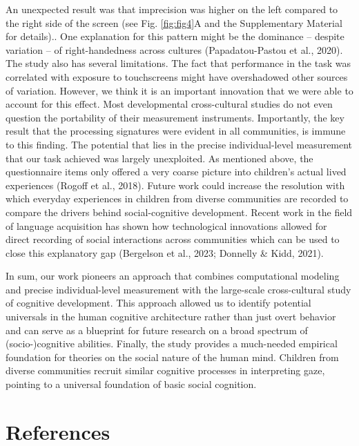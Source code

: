 \documentclass[
  man,floatsintext]{apa7}
\begin{document}
An unexpected result was that imprecision was higher on the left compared to the right side of the screen (see Fig. \ref{fig:fig4}A and the Supplementary Material for details).. One explanation for this pattern might be the dominance -- despite variation -- of right-handedness across cultures (Papadatou-Pastou et al., 2020). The study also has several limitations. The fact that performance in the task was correlated with exposure to touchscreens might have overshadowed other sources of variation. However, we think it is an important innovation that we were able to account for this effect. Most developmental cross-cultural studies do not even question the portability of their measurement instruments. Importantly, the key result that the processing signatures were evident in all communities, is immune to this finding. The potential that lies in the precise individual-level measurement that our task achieved was largely unexploited. As mentioned above, the questionnaire items only offered a very coarse picture into children's actual lived experiences (Rogoff et al., 2018). Future work could increase the resolution with which everyday experiences in children from diverse communities are recorded to compare the drivers behind social-cognitive development. Recent work in the field of language acquisition has shown how technological innovations allowed for direct recording of social interactions across communities which can be used to close this explanatory gap (Bergelson et al., 2023; Donnelly \& Kidd, 2021).

In sum, our work pioneers an approach that combines computational modeling and precise individual-level measurement with the large-scale cross-cultural study of cognitive development. This approach allowed us to identify potential universals in the human cognitive architecture rather than just overt behavior and can serve as a blueprint for future research on a broad spectrum of (socio-)cognitive abilities. Finally, the study provides a much-needed empirical foundation for theories on the social nature of the human mind. Children from diverse communities recruit similar cognitive processes in interpreting gaze, pointing to a universal foundation of basic social cognition.

\newpage

\section{References}\label{references}
\end{document}
